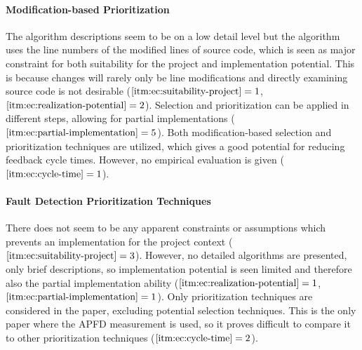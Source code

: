 \documentclass[a4paper,english,12pt]{report}
\begin{document}
\paragraph{Modification-based Prioritization \citep{malhotra2010regression}}
The algorithm descriptions seem to be on a low detail level but the algorithm uses the line numbers of the modified lines of source code, which is seen as major constraint for both suitability for the project and implementation potential. This is because changes will rarely only be line modifications and directly examining source code is not desirable ($\text{\ref{itm:ec:suitability-project}} = 1$, $\text{\ref{itm:ec:realization-potential}} = 2$). Selection and prioritization can be applied in different steps, allowing for partial implementations ($\text{\ref{itm:ec:partial-implementation}} = 5$). Both modification-based selection and prioritization techniques are utilized, which gives a good potential for reducing feedback cycle times. However, no empirical evaluation is given ($\text{\ref{itm:ec:cycle-time}} = 1$).

\paragraph{Fault Detection Prioritization Techniques \citep{rothermel1999testcase}}
There does not seem to be any apparent constraints or assumptions which prevents an implementation for the project context ($\text{\ref{itm:ec:suitability-project}} = 3$). However, no detailed algorithms are presented, only brief descriptions, so implementation potential is seen limited and therefore also the partial implementation ability ($\text{\ref{itm:ec:realization-potential}} = 1$, $\text{\ref{itm:ec:partial-implementation}} = 1$). Only prioritization techniques are considered in the paper, excluding potential selection techniques. This is the only paper where the APFD measurement is used, so it proves difficult to compare it to other prioritization techniques ($\text{\ref{itm:ec:cycle-time}} = 2$).
\end{document}
